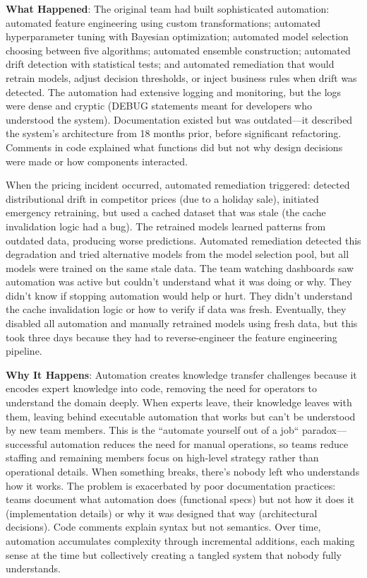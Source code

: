 \textbf{What Happened}: The original team had built sophisticated automation: automated feature engineering using custom transformations; automated hyperparameter tuning with Bayesian optimization; automated model selection choosing between five algorithms; automated ensemble construction; automated drift detection with statistical tests; and automated remediation that would retrain models, adjust decision thresholds, or inject business rules when drift was detected. The automation had extensive logging and monitoring, but the logs were dense and cryptic (DEBUG statements meant for developers who understood the system). Documentation existed but was outdated---it described the system's architecture from 18 months prior, before significant refactoring. Comments in code explained what functions did but not why design decisions were made or how components interacted.

When the pricing incident occurred, automated remediation triggered: detected distributional drift in competitor prices (due to a holiday sale), initiated emergency retraining, but used a cached dataset that was stale (the cache invalidation logic had a bug). The retrained models learned patterns from outdated data, producing worse predictions. Automated remediation detected this degradation and tried alternative models from the model selection pool, but all models were trained on the same stale data. The team watching dashboards saw automation was active but couldn't understand what it was doing or why. They didn't know if stopping automation would help or hurt. They didn't understand the cache invalidation logic or how to verify if data was fresh. Eventually, they disabled all automation and manually retrained models using fresh data, but this took three days because they had to reverse-engineer the feature engineering pipeline.

\textbf{Why It Happens}: Automation creates knowledge transfer challenges because it encodes expert knowledge into code, removing the need for operators to understand the domain deeply. When experts leave, their knowledge leaves with them, leaving behind executable automation that works but can't be understood by new team members. This is the ``automate yourself out of a job`` paradox---successful automation reduces the need for manual operations, so teams reduce staffing and remaining members focus on high-level strategy rather than operational details. When something breaks, there's nobody left who understands how it works. The problem is exacerbated by poor documentation practices: teams document what automation does (functional specs) but not how it does it (implementation details) or why it was designed that way (architectural decisions). Code comments explain syntax but not semantics. Over time, automation accumulates complexity through incremental additions, each making sense at the time but collectively creating a tangled system that nobody fully understands.


